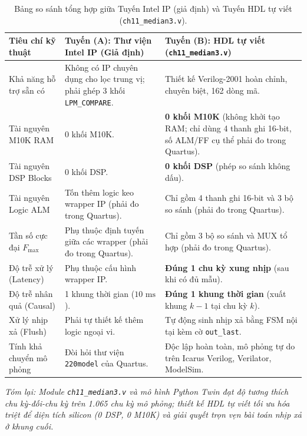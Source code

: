 \begin{table}[htbp]
\centering
\small
\caption{Bảng so sánh tổng hợp giữa Tuyến Intel IP (giả định) và Tuyến HDL tự viết (\texttt{ch11\_median3.v}).}
\label{tab:ch11_ip_vs_hdl}
\begin{tabular}{p{3.5cm}p{5.5cm}p{5.8cm}}
\toprule
\textbf{Tiêu chí kỹ thuật} & \textbf{Tuyến (A): Thư viện Intel IP (Giả định)} & \textbf{Tuyến (B): HDL tự viết (\texttt{ch11\_median3.v})} \\
\midrule
Khả năng hỗ trợ sẵn có & Không có IP chuyên dụng cho lọc trung vị; phải ghép 3 khối \texttt{LPM\_COMPARE}. & Thiết kế Verilog-2001 hoàn chỉnh, chuyên biệt, 162 dòng mã. \\
Tài nguyên M10K RAM & 0 khối M10K. & \textbf{0 khối M10K} (không khởi tạo RAM; chỉ dùng 4 thanh ghi 16-bit, số ALM/FF cụ thể phải đo trong Quartus). \\
Tài nguyên DSP Blocks & 0 khối DSP. & \textbf{0 khối DSP} (phép so sánh không dấu). \\
Tài nguyên Logic ALM & Tốn thêm logic keo wrapper IP (phải đo trong Quartus). & Chỉ gồm 4 thanh ghi 16-bit và 3 bộ so sánh (phải đo trong Quartus). \\
Tần số cực đại $F_{\max}$ & Phụ thuộc định tuyến giữa các wrapper (phải đo trong Quartus). & Chỉ gồm 3 bộ so sánh và MUX tổ hợp (phải đo trong Quartus). \\
Độ trễ xử lý (Latency) & Phụ thuộc cấu hình wrapper IP. & \textbf{Đúng 1 chu kỳ xung nhịp} (sau khi có đủ mẫu). \\
Độ trễ nhân quả (Causal) & 1 khung thời gian ($10\text{ ms}$). & \textbf{Đúng 1 khung thời gian} (xuất khung $k-1$ tại chu kỳ $k$). \\
Xử lý nhịp xả (Flush) & Phải tự thiết kế thêm logic ngoại vi. & Tự động sinh nhịp xả bằng FSM nội tại kèm cờ \texttt{out\_last}. \\
Tính khả chuyển mô phỏng & Đòi hỏi thư viện \texttt{220model} của Quartus. & Độc lập hoàn toàn, mô phỏng tự do trên Icarus Verilog, Verilator, ModelSim. \\
\bottomrule
\end{tabular}
\end{table}

\textit{Tóm lại: Module \texttt{ch11\_median3.v} và mô hình Python Twin đạt độ tương thích chu kỳ-đối-chu kỳ trên 1.065 chu kỳ mô phỏng; thiết kế HDL tự viết tối ưu hóa triệt để diện tích silicon (0 DSP, 0 M10K) và giải quyết trọn vẹn bài toán nhịp xả ở khung cuối.}

